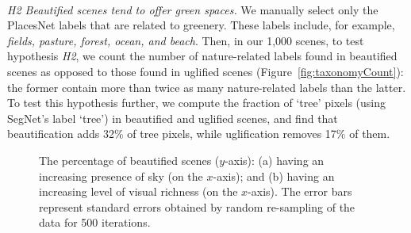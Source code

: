 \mbox{ } \\
\noindent
\emph{H2 Beautified scenes tend to offer green spaces.}
We manually select only the PlacesNet labels that are related to greenery. These labels include, for example, \textit{fields, pasture, forest, ocean, and beach}. Then, in our 1,000 scenes, to test hypothesis \emph{H2}, we count the number of nature-related labels found in beautified scenes as opposed to those found in uglified scenes (Figure~\ref{fig:taxonomyCount}): the former contain more than twice as many nature-related labels than the latter.  To test this hypothesis further, we compute the fraction of `tree' pixels (using SegNet's label `tree') in beautified and uglified scenes, and  find that beautification adds  32\% of tree pixels, while uglification removes 17\% of them. 


\begin{figure}[!t]
	\centering
	\hspace*{-5mm}
\vspace{-0.4cm}
\label{fig:bin_figures}
\caption{The percentage of beautified scenes ($y$-axis): (a) having an increasing presence of sky (on the $x$-axis); and (b) having an increasing level of visual richness  (on the $x$-axis). The error bars represent standard errors obtained by random re-sampling of the data for 500 iterations. }
\vspace{-0.4cm}
\end{figure}



